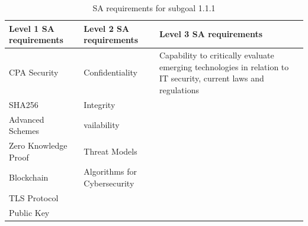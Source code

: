 \begin{table}[H]
    \begin{center}
    \begin{tabular}{ | m{5cm} | m{5cm}| m{5cm} | } 
      \hline
      \textbf{Level 1 SA requirements} & \textbf{Level 2 SA requirements}  & \textbf{Level 3 SA requirements}  \\ 
      \hline
      CPA Security & Confidentiality & Capability to critically evaluate emerging technologies in relation to IT security, current laws and regulations\\ 
      \hline
      SHA256 & Integrity & \\ 
      \hline
      Advanced Schemes & vailability & \\ 
      \hline
      Zero Knowledge Proof &  Threat Models & \\ 
      \hline
      Blockchain & Algorithms for Cybersecurity  & \\ 
      \hline
      TLS Protocol &  & \\ 
      \hline
      Public Key&  & \\ 
      \hline
    \end{tabular}
    \end{center}
    \caption{SA requirements for subgoal 1.1.1}
    \end{table}
    
\newpage
